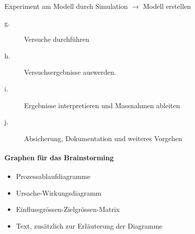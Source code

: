 Experiment am Modell durch Simulation $\rightarrow$ Modell erstellen
\begin{description}
\item[g.] Versuche durchführen
\item[h.] Versuchsergebnisse auswerden.
\item[i.] Ergebnisse interpretieren und Massnahmen ableiten
\item[j.] Absicherung, Dokumentation und weiteres Vorgehen
\end{description}

\paragraph{Graphen für das Brainstorming}
\begin{itemize}
	\item Prozessablaufdiagramme
	\item Ursache-Wirkungsdiagramm
	\item Einflussgrössen-Zielgrössen-Matrix
	\item Text, zusätzlich zur Erläuterung der Diagramme
\end{itemize}

